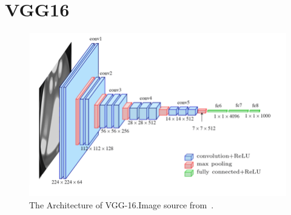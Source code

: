 \section{VGG16}

\begin{figure}[!htbp]
	\centering
	\includegraphics[width=0.8\linewidth]{figures/vgg16}
	\caption[The Architecture of VGG-16]{The Architecture of VGG-16.Image source from~\cite{vgg16img}.}
	\label{fig:vgg16}
\end{figure}
